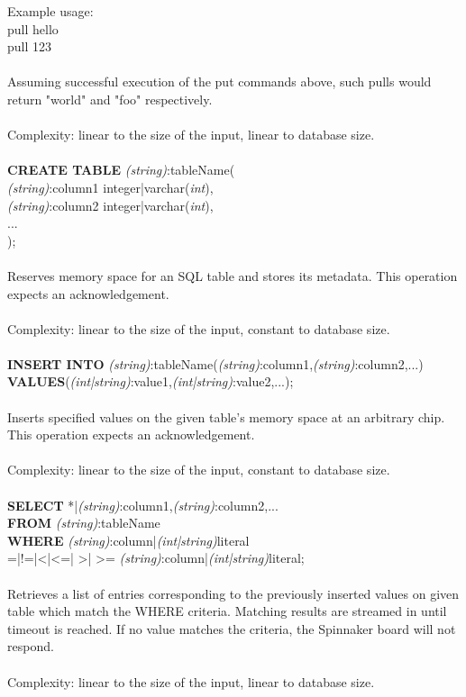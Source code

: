 \documentclass{article}
\begin{document}
\noindent
 Example usage:\\
 pull hello\\
 pull 123\\\\
 Assuming successful execution of the put commands above, such pulls would return "world" and "foo" respectively.\\\\
 Complexity: linear to the size of the input, linear to database size.\\\\
 \newpage
\noindent 
  {\large\textbf{CREATE TABLE} \textit{(string)}:tableName(\\
  	\textit{(string)}:column1 integer|varchar(\textit{int}),\\
  	\textit{(string)}:column2 integer|varchar(\textit{int}),\\
  	...\\
  	);}\\\\
\noindent
  Reserves memory space for an SQL table and stores its metadata. This operation expects an acknowledgement.\\\\
   Complexity: linear to the size of the input, constant to database size.\\\\
 \noindent
  {\large\textbf{INSERT INTO} \textit{(string)}:tableName(\textit{(string)}:column1,\textit{(string)}:column2,...)\\
  \textbf{VALUES}(\textit{(int|string)}:value1,\textit{(int|string)}:value2,...);}\\\\
\noindent
  Inserts specified values on the given table's memory space at an arbitrary chip. This operation expects an acknowledgement.\\\\
\noindent
   Complexity: linear to the size of the input, constant to database size.\\\\
\noindent
  {\large\textbf{SELECT} *|\textit{(string)}:column1,\textit{(string)}:column2,...\\
  \textbf{FROM} \textit{(string)}:tableName\\
  \textbf{WHERE} \textit{(string)}:column|\textit{(int|string)}literal \\=|!=|\textless |\textless =|
  \textgreater | \textgreater = \textit{(string)}:column|\textit{(int|string)}literal;}\\\\
\noindent
  Retrieves a list of entries corresponding to the previously inserted values on given table which match the WHERE criteria. Matching results are streamed in until timeout is reached. If no value matches the criteria, the Spinnaker board will not respond.\\\\
\noindent
Complexity: linear to the size of the input, linear to database size.\\\\
  
\end{document}
